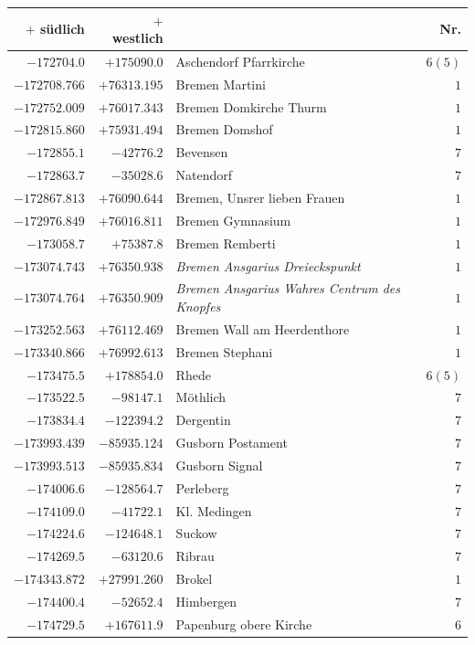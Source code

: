 \clearpage
\begin{center}\begingroup\fontsize{8}{9}\selectfont
\setlength{\tabcolsep}{4pt}
\begin{tabular}{r|r|p{170pt}|r}\hline
\(+\) südlich&\(+\) westlich&&Nr.\\\hline
\(-172704.0\)&\(+175090.0\)&Aschendorf Pfarrkirche&\(6 (5)\)\\
\(-172708.766\)&\(+76313.195\)&Bremen Martini&\(1\)\\
\(-172752.009\)&\(+76017.343\)&Bremen Domkirche Thurm&\(1\)\\
\(-172815.860\)&\(+75931.494\)&Bremen Domshof&\(1\)\\
\(-172855.1\)&\(-42776.2\)&Bevensen&\(7\)\\
\(-172863.7\)&\(-35028.6\)&Natendorf&\(7\)\\
\(-172867.813\)&\(+76090.644\)&Bremen, Unsrer lieben Frauen&\(1\)\\
\(-172976.849\)&\(+76016.811\)&Bremen Gymnasium&\(1\)\\
\(-173058.7\)&\(+75387.8\)&Bremen Remberti&\(1\)\\
\(-173074.743\)&\(+76350.938\)&\textit{Bremen Ansgarius Dreieckspunkt}&\(1\)\\
\(-173074.764\)&\(+76350.909\)&\textit{Bremen Ansgarius Wahres Centrum des Knopfes}&\(1\)\\
\(-173252.563\)&\(+76112.469\)&Bremen Wall am Heerdenthore&\(1\)\\
\(-173340.866\)&\(+76992.613\)&Bremen Stephani&\(1\)\\
\(-173475.5\)&\(+178854.0\)&Rhede&\(6 (5)\)\\
\(-173522.5\)&\(-98147.1\)&Möthlich&\(7\)\\
\(-173834.4\)&\(-122394.2\)&Dergentin&\(7\)\\
\(-173993.439\)&\(-85935.124\)&Gusborn Postament&\(7\)\\
\(-173993.513\)&\(-85935.834\)&Gusborn Signal&\(7\)\\
\(-174006.6\)&\(-128564.7\)&Perleberg&\(7\)\\
\(-174109.0\)&\(-41722.1\)&Kl. Medingen&\(7\)\\
\(-174224.6\)&\(-124648.1\)&Suckow&\(7\)\\
\(-174269.5\)&\(-63120.6\)&Ribrau&\(7\)\\
\(-174343.872\)&\(+27991.260\)&Brokel&\(1\)\\
\(-174400.4\)&\(-52652.4\)&Himbergen&\(7\)\\
\(-174729.5\)&\(+167611.9\)&Papenburg obere Kirche&\(6\)\\

\end{tabular}
\end{center}
